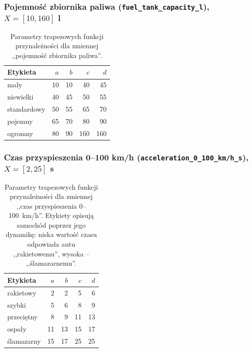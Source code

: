 \documentclass{article}
\begin{document}
\subsubsection{Pojemność zbiornika paliwa (\texttt{fuel\_tank\_capacity\_l}), $X = [10, 160]$ l}
\begin{table}[H]
\centering
\caption{Parametry trapezowych funkcji przynależności dla zmiennej
,,pojemność zbiornika paliwa''.}
\label{tab:mf-tank}
\begin{tabular}{l r r r r}
\toprule
Etykieta & $a$ & $b$ & $c$ & $d$ \\
\midrule
mały         & 10 & 10 & 40 & 45 \\
niewielki    & 40 & 45 & 50 & 55 \\
standardowy  & 50 & 55 & 65 & 70 \\
pojemny      & 65 & 70 & 80 & 90 \\
ogromny      & 80 & 90 & 160 & 160 \\
\bottomrule
\end{tabular}
\end{table}

\subsubsection{Czas przyspieszenia 0--100 km/h (\texttt{acceleration\_0\_100\_km/h\_s}), $X = [2, 25]$ s}
\begin{table}[H]
\centering
\caption{Parametry trapezowych funkcji przynależności dla zmiennej
,,czas przyspieszenia 0--100~km/h''. Etykiety opisują samochód
poprzez jego dynamikę: niska wartość czasu odpowiada autu
,,rakietowemu'', wysoka -- ,,ślamazarnemu''.}
\label{tab:mf-accel}
\begin{tabular}{l r r r r}
\toprule
Etykieta & $a$ & $b$ & $c$ & $d$ \\
\midrule
rakietowy   &  2 &  2 &  5 &  6 \\
szybki      &  5 &  6 &  8 &  9 \\
przeciętny  &  8 &  9 & 11 & 13 \\
ospały      & 11 & 13 & 15 & 17 \\
ślamazarny  & 15 & 17 & 25 & 25 \\
\bottomrule
\end{tabular}
\end{table}
\end{document}

